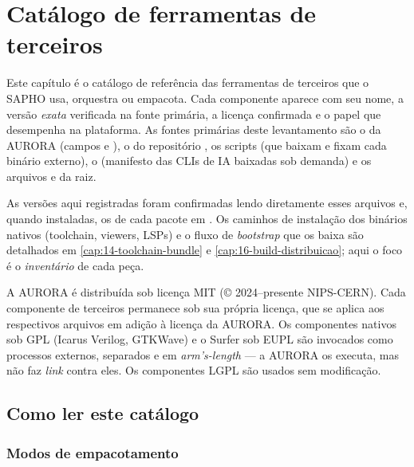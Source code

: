 \chapter{Catálogo de ferramentas de terceiros}
\label{cap:15-catalogo-terceiros}

Este capítulo é o catálogo de referência das ferramentas de terceiros que o
SAPHO usa, orquestra ou empacota. Cada componente aparece com seu nome, a versão
\emph{exata} verificada na fonte primária, a licença confirmada e o papel que
desempenha na plataforma. As fontes primárias deste levantamento são o
 da AURORA (campos  e ),
o  do repositório , os scripts
 (que baixam e fixam cada binário externo),
o  (manifesto das CLIs de IA baixadas sob demanda)
e os arquivos  e  da raiz.

As versões aqui registradas foram confirmadas lendo diretamente esses arquivos e,
quando instaladas, os  de cada pacote em .
Os caminhos de instalação dos binários nativos (toolchain, viewers, LSPs) e o
fluxo de \emph{bootstrap} que os baixa são detalhados em
\autoref{cap:14-toolchain-bundle} e \autoref{cap:16-build-distribuicao}; aqui o foco é
o \emph{inventário} de cada peça.

\begin{nota}
A AURORA é distribuída sob licença MIT (\copyright{} 2024--presente NIPS-CERN).
Cada componente de terceiros permanece sob sua própria licença, que se aplica aos
respectivos arquivos em adição à licença da AURORA. Os componentes nativos sob
GPL (Icarus Verilog, GTKWave) e o Surfer sob EUPL são invocados como processos
externos, separados e em \emph{arm's-length} --- a AURORA os executa, mas não
faz \emph{link} contra eles. Os componentes LGPL são usados sem modificação.
\end{nota}

\section{Como ler este catálogo}

\subsection{Modos de empacotamento}

